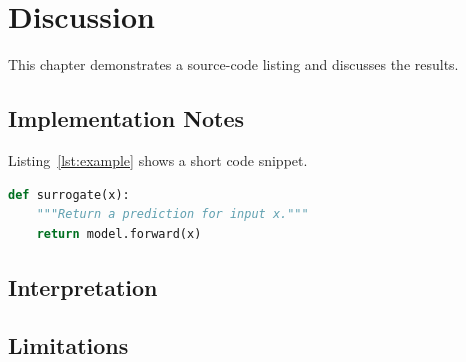 \chapter{Discussion}
\label{ch:discussion}

This chapter demonstrates a source-code listing and discusses the results.

\section{Implementation Notes}
\label{sec:implementation}

Listing~\ref{lst:example} shows a short code snippet.

\begin{lstlisting}[language=Python, caption={A short Python example.}, label={lst:example}]
def surrogate(x):
    """Return a prediction for input x."""
    return model.forward(x)
\end{lstlisting}

\section{Interpretation}
\label{sec:interpretation}

\lipsum[8]

\section{Limitations}
\label{sec:limitations}
\lipsum[9]
